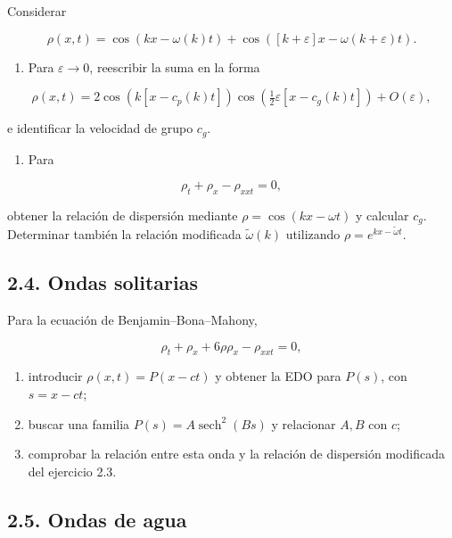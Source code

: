 \documentclass[11pt,a4paper]{article}
\providecommand{\tightlist}{\setlength{\itemsep}{0pt}\setlength{\parskip}{0pt}}
\begin{document}
Considerar

\[\rho(x,t)=\cos(kx-\omega(k)t)+\cos([k+\varepsilon]x-\omega(k+\varepsilon)t).\]

\begin{enumerate}
\def\labelenumi{(\alph{enumi})}
\tightlist
\item
  Para \(\varepsilon\to0\), reescribir la suma en la forma
\end{enumerate}

\[\rho(x,t)=2\cos(k[x-c_p(k)t])\cos\!\left(\tfrac12\varepsilon[x-c_g(k)t]\right)+O(\varepsilon),\]

e identificar la velocidad de grupo \(c_g\).

\begin{enumerate}
\def\labelenumi{(\alph{enumi})}
\setcounter{enumi}{1}
\tightlist
\item
  Para
\end{enumerate}

\[\rho_t+\rho_x-\rho_{xxt}=0,\tag{2.51}\]

obtener la relación de dispersión mediante \(\rho=\cos(kx-\omega t)\) y
calcular \(c_g\). Determinar también la relación modificada
\(\widetilde\omega(k)\) utilizando \(\rho=e^{kx-\widetilde\omega t}\).

\hypertarget{ondas-solitarias}{%
\subsection{2.4. Ondas solitarias}\label{ondas-solitarias}}

Para la ecuación de Benjamin--Bona--Mahony,

\[\rho_t+\rho_x+6\rho\rho_x-\rho_{xxt}=0,\]

\begin{enumerate}
\def\labelenumi{(\alph{enumi})}
\item
  introducir \(\rho(x,t)=P(x-ct)\) y obtener la EDO para \(P(s)\), con
  \(s=x-ct\);
\item
  buscar una familia \(P(s)=A\operatorname{sech}^2(Bs)\) y relacionar
  \(A,B\) con \(c\);
\item
  comprobar la relación entre esta onda y la relación de dispersión
  modificada del ejercicio 2.3.
\end{enumerate}

\hypertarget{ondas-de-agua}{%
\subsection{2.5. Ondas de agua}\label{ondas-de-agua}}
\end{document}
